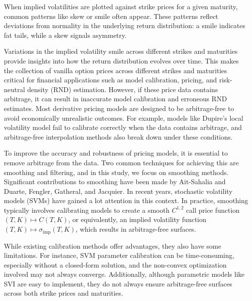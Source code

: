 When implied volatilities are plotted against strike prices for a given maturity, 
common patterns like skew or smile often appear. 
These patterns reflect deviations from normality in the underlying return distribution: 
a smile indicates fat tails, while a skew signals asymmetry.

Variations in the implied volatility smile across different strikes and maturities provide insights into how the return 
distribution evolves over time. This makes the collection of vanilla option prices across different strikes and maturities 
critical for financial applications such as model calibration, pricing, and risk-neutral density (RND) estimation. 
However, if these price data contains arbitrage, it can result in inaccurate model calibration and erroneous RND estimates. 
Most derivative pricing models are designed to be arbitrage-free to avoid economically unrealistic outcomes. 
For example, models like Dupire's local volatility model fail to calibrate correctly when the data contains arbitrage, 
and arbitrage-free interpolation methods also break down under these conditions.

To improve the accuracy and robustness of pricing models, it is essential to remove arbitrage from the data. 
Two common techniques for achieving this are smoothing and filtering, and in this study, we focus on smoothing methods. 
Significant contributions to smoothing have been made by Ait-Sahalia and Duarte, Fengler, Gatheral, and Jacquier. 
In recent years, stochastic volatility models (SVMs) have gained a lot attention in this context. 
In practice, smoothing typically involves calibrating models to create a smooth \(C^{1,2}\) call price function 
\((T,K)\mapsto C(T,K)\), or equivalently, an implied volatility function \((T,K)\mapsto\sigma_{\text{imp}}(T,K)\), 
which results in arbitrage-free surfaces.

While existing calibration methods offer advantages, they also have some limitations. 
For instance, SVM parameter calibration can be time-consuming, especially without a closed-form solution, 
and the non-convex optimization involved may not always converge. Additionally, 
although parametric models like SVI are easy to implement, they do not always ensure arbitrage-free surfaces across both strike prices and maturities.

